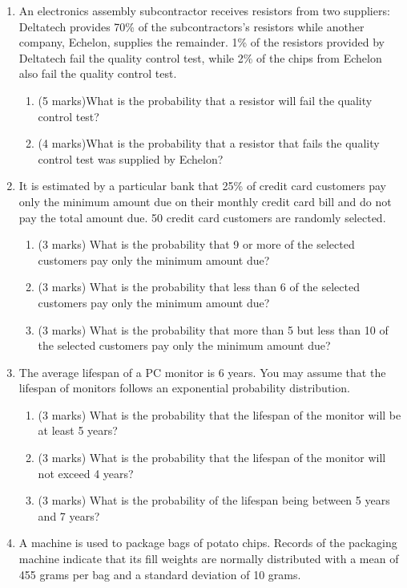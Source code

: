 	\begin{enumerate}
		
		\item An electronics assembly subcontractor receives resistors from two suppliers: Deltatech provides
		70\% of the subcontractors's resistors while another company, Echelon, supplies the remainder.
		1\% of the resistors provided by Deltatech fail the quality control test, while 2\% of the
		chips from Echelon also fail the quality control test.
		
		\begin{enumerate}
			\item (5 marks)What is the probability that a resistor will fail the quality control test?
			
			
			\item (4 marks)What is the probability that a resistor that fails the quality control test was supplied by Echelon?
		\end{enumerate}
		
		
		\vspace{0.25cm}
		
		
		\item It is estimated by a particular bank that 25\% of credit card customers pay only the minimum amount due on their monthly credit card bill and do not pay the total amount due. 50 credit card customers are randomly selected.
		\begin{enumerate}
			\item (3 marks)	What is the probability that 9 or more of the selected customers pay only the minimum amount due?
			\item (3 marks) What is the probability that less than 6 of the selected customers pay only the minimum amount due?
			\item (3 marks)	What is the probability that more than 5 but less than 10 of the selected customers pay only the minimum amount due?
		\end{enumerate}
		
		
		
		\vspace{0.25cm}
		\item The average lifespan of a PC monitor is 6 years. You may assume that the lifespan of monitors follows an exponential probability distribution.
		\begin{enumerate}
			\item (3 marks) What is the probability that the lifespan of the monitor will be at least 5 years?
			\item (3 marks) What is the probability that the lifespan of the monitor will not exceed 4 years?
			\item (3 marks) What is the probability of the lifespan being between 5 years and 7 years?
		\end{enumerate}
		\vspace{0.25cm}
		\item A machine is used to package bags of potato chips.  Records of the packaging machine indicate that its fill weights are normally distributed with a mean of 455 grams per bag and a standard deviation of 10 grams.
		

\end{enumerate}
